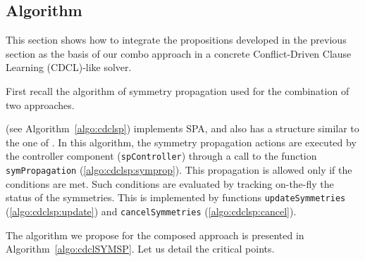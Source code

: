 \subsection{Algorithm}

This section shows how to integrate the propositions developed in the previous
section as the basis of our combo approach in a concrete
Conflict-Driven Clause Learning (CDCL)-like solver.

First recall the algorithm of symmetry propagation used for the combination of two approaches.






{\cdclsp} (see Algorithm~\ref{algo:cdclsp}) implements SPA, and also has a
structure similar to the one of {\cdcl}. In this algorithm, the symmetry
propagation actions are executed by the controller component (\texttt{spController})
through a call to the function \texttt{symPropagation} (\cref{algo:cdclsp:symprop}). This
propagation is allowed only if the conditions %
are met. Such conditions are evaluated by tracking on-the-fly the status of the
symmetries. This is implemented by functions \texttt{updateSymmetries} (\cref{algo:cdclsp:update})
and \texttt{cancelSymmetries} (\cref{algo:cdclsp:cancel}).


 

The algorithm we propose for the composed approach is presented in
Algorithm~\ref{algo:cdclSYMSP}. 
Let us detail the critical points.

